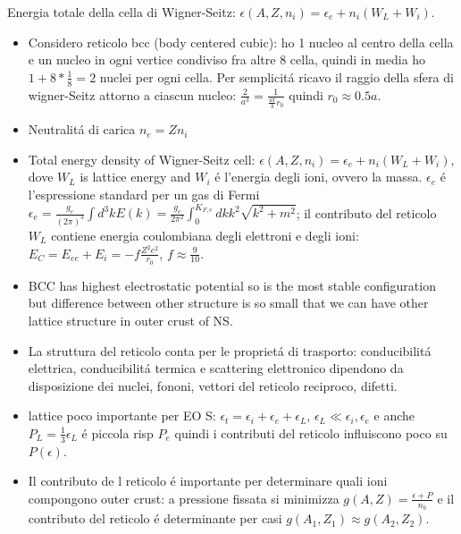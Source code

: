 \begin{frame}{Energia totale della cella di Wigner-Seitz: $\epsilon(A,Z,n_i)=\epsilon_e+n_i(W_L+W_i)$.}
    \begin{itemize}
        \item Considero reticolo bcc  (body centered cubic): ho 1 nucleo al centro della cella e un nucleo in ogni vertice condiviso fra altre 8 cella, quindi in media ho $1+8*\frac{1}{8}=2$ nuclei per ogni cella. Per semplicit\'a ricavo il raggio della sfera di wigner-Seitz attorno a ciascun nucleo: $\frac{2}{a^3}=\frac{1}{\frac{4\pi}{3}r_0}$ quindi $r_0\approx0.5a$.
        \item Neutralit\'a di carica $n_e=Zn_i$
        \item Total energy density of Wigner-Seitz cell: $\epsilon(A,Z,n_i)=\epsilon_e+n_i(W_L+W_i)$, dove $W_L$ is lattice energy and $W_i$ \'e l'energia degli ioni, ovvero la massa. $\epsilon_e$ \'e l'espressione standard per un gas di Fermi $\epsilon_e=\frac{g_e}{(2\pi)^3}\int d^3kE(k)=\frac{g_e}{2\pi^2}\int_0^{K_{F,e}}dkk^2\sqrt{k^2+m^2}$; il contributo del reticolo $W_L$ contiene energia coulombiana degli elettroni e degli ioni: $E_C=E_{ee}+E_i=-f\frac{Z^2e^2}{r_0}$, $f\approx \frac{9}{10}$.
        \item BCC has highest electrostatic potential so is the most stable configuration but difference between other structure is so small that we can have other lattice structure in outer crust of NS.
        \item La struttura del reticolo conta per le propriet\'a di trasporto: conducibilit\'a elettrica, conducibilit\'a termica e scattering elettronico dipendono da disposizione dei nuclei, fononi, vettori del reticolo reciproco, difetti.
        \item lattice poco importante per EO S: $\epsilon_t=\epsilon_i+\epsilon_e+\epsilon_L$, $\epsilon_L\ll\epsilon_i,\epsilon_e$ e anche $P_L=\frac{1}{3}\epsilon_L$ \'e piccola risp $P_e$ quindi i contributi del reticolo influiscono poco su $P(\epsilon)$.
        \item Il contributo de l reticolo \'e importante per determinare quali ioni compongono outer crust: a pressione fissata si minimizza $g(A,Z)=\frac{\epsilon+P}{n_b}$ e il contributo del reticolo \'e determinante per casi $g(A_1,Z_1)\approx g(A_2,Z_2)$.
    \end{itemize}
\end{frame}

